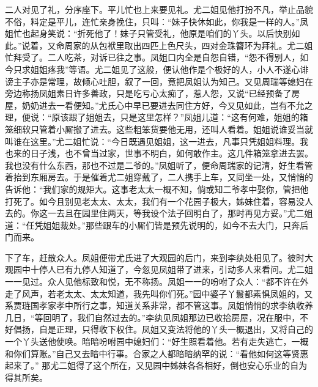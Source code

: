 二人对见了礼，分序座下。平儿忙也上来要见礼。尤二姐见他打扮不凡，举止品貌不俗，料定是平儿，连忙亲身挽住，只叫：``妹子快休如此，你我是一样的人。''凤姐忙也起身笑说：``折死他了！妹子只管受礼，他原是咱们的丫头。以后快别如此。''说着，又命周家的从包袱里取出四匹上色尺头，四对金珠簪环为拜礼。尤二姐忙拜受了。二人吃茶，对诉已往之事。凤姐口内全是自怨自错，``怨不得别人，如今只求姐姐疼我''等语。尤二姐见了这般，便认他作是个极好的人，小人不遂心诽谤主子亦是常理，故倾心吐胆，叙了一回，竟把凤姐认为知己。又见周瑞等媳妇在旁边称扬凤姐素日许多善政，只是吃亏心太痴了，惹人怨，又说``已经预备了房屋，奶奶进去一看便知。''尤氏心中早已要进去同住方好，今又见如此，岂有不允之理，便说：``原该跟了姐姐去，只是这里怎样？''凤姐儿道：``这有何难，姐姐的箱笼细软只管着小厮搬了进去。这些粗笨货要他无用，还叫人看着。姐姐说谁妥当就叫谁在这里。''尤二姐忙说：``今日既遇见姐姐，这一进去，凡事只凭姐姐料理。我也来的日子浅，也不曾当过家，世事不明白，如何敢作主。这几件箱笼拿进去罢。我也没有什么东西，那也不过是二爷的。''凤姐听了，便命周瑞家的记清，好生看管着抬到东厢房去。于是催着尤二姐穿戴了，二人携手上车，又同坐一处，又悄悄的告诉他：``我们家的规矩大。这事老太太一概不知，倘或知二爷孝中娶你，管把他打死了。如今且别见老太太、太太，我们有一个花园子极大，姊妹住着，容易没人去的。你这一去且在园里住两天，等我设个法子回明白了，那时再见方妥。''尤二姐道：``任凭姐姐裁处。''那些跟车的小厮们皆是预先说明的，如今不去大门，只奔后门而来。

下了车，赶散众人。凤姐便带尤氏进了大观园的后门，来到李纨处相见了。彼时大观园中十停人已有九停人知道了，今忽见凤姐带了进来，引动多人来看问。尤二姐一一见过。众人见他标致和悦，无不称扬。凤姐一一的吩咐了众人：``都不许在外走了风声，若老太太、太太知道，我先叫你们死。''园中婆子丫鬟都素惧凤姐的，又系贾琏国孝家孝中所行之事，知道关系非常，都不管这事。凤姐悄悄的求李纨收养几日，``等回明了，我们自然过去的。''李纨见凤姐那边已收拾房屋，况在服中，不好倡扬，自是正理，只得收下权住。凤姐又变法将他的丫头一概退出，又将自己的一个丫头送他使唤。暗暗吩咐园中媳妇们：``好生照看着他。若有走失逃亡，一概和你们算账。''自己又去暗中行事。合家之人都暗暗纳罕的说：``看他如何这等贤惠起来了。''
那尤二姐得了这个所在，又见园中姊妹各各相好，倒也安心乐业的自为得其所矣。

